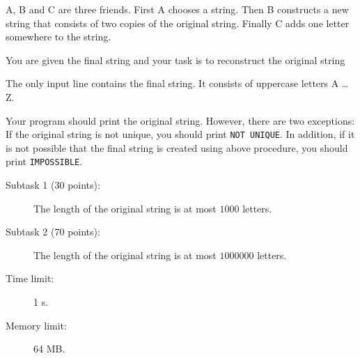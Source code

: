 \documentclass{boi2014}
\begin{document}
    A, B and C are three friends. First A chooses a string. Then
    B constructs a new string that consists of two copies of the original
    string. Finally C adds one letter somewhere to the string.
    

    \Task
    You are given the final string and your task is to reconstruct the original
    string

    \Input
    The only input line contains the final string. It consists of
    uppercase letters A \ldots{} Z.

    \Output
    Your program should print the original string.
    However, there are two exceptions:
    If the original string is not unique, you should print {\tt NOT UNIQUE}.
    In addition, if it is not possible that the final string
    is created using above procedure, you should print {\tt IMPOSSIBLE}.
    

    \Examples


    \Scoring

    \begin{description}
        \item[Subtask 1 (30 points):] The length of the original string is at
        most $1000$ letters.
        \item[Subtask 2 (70 points):] The length of the original string is at
        most $1000000$ letters.
    \end{description}

    \Constraints

    \begin{description}
        \item[Time limit:] 1 s.
        \item[Memory limit:] 64 MB.
    \end{description}
\end{document}

